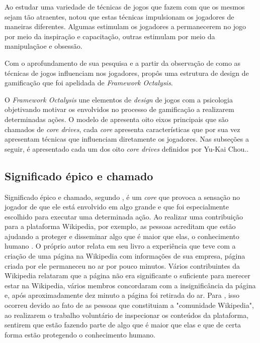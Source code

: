 Ao estudar uma variedade de técnicas de jogos que fazem com que os mesmos sejam tão atraentes,  notou que estas 
técnicas impulsionam os jogadores de maneiras diferentes. Algumas estimulam os jogadores a permanecerem no jogo por meio da
inspiração e capacitação, outras estimulam por meio da manipulaçãoe e obsessão.

Com o aprofundamento de sua pesquisa e a partir da observação de como as técnicas de jogos influenciam nos jogadores,  
propôs uma estrutura de design de gamificação que foi apelidada de  \textit{Framework Octalysis}.

O \textit{Framework Octalysis} une elementos de \textit{design} de jogos com a psicologia objetivando motivar os envolvidos
no processo de gamificação a realizarem determinadas ações. O modelo de  apresenta oito eixos principais que 
são chamados de \textit{core drives}, cada \textit{core} apresenta características que por sua vez apresentam técnicas que
influenciam diretamente os jogadores. Nas subseções a seguir, é apresentado cada um dos oito \textit{core drives}
definidos por Yu-Kai Chou..

\subsection{Significado épico e chamado}
Significado épico e chamado, segundo , é um \textit{core} que provoca a sensação no jogador de que ele está envolvido em algo 
grande e que foi especialmente escolhido para executar uma determinada ação. Ao realizar uma contribuição para a plataforma Wikipedia, por exemplo,
as pessoas acreditam que estão ajudando a proteger e disseminar algo que é maior que elas, o conhecimento humano \cite{chou2017actionable}. O próprio autor relata 
em seu livro a experiência que teve com a criação de uma página na Wikipedia com informações de sua empresa, página criada por ele permaneceu no ar por pouco minutos.
Vários contribuintes da Wikipedia relataram que a página não era significante o suficiente para merecer estar na Wikipedia, vários membros concordaram com
a insignificância da página e, após aproximadamente dez minuto a página foi retirada do ar. Para , isso 
ocorreu devido ao fato de as pessoas que constituiam a "comunidade Wikipedia", ao realizarem o trabalho voluntário de inspecionar os conteúdos da plataforma, sentirem
que estão fazendo parte de algo que é maior que elas e que de certa forma estão protegendo o conhecimento humano.

